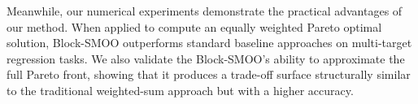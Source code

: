\documentclass[11pt,a4paper]{article}
\numberwithin{equation}{section}%
\renewcommand{\(}{\left (}
\renewcommand{\)}{\right )}
\begin{document}
Meanwhile, our numerical experiments demonstrate the practical advantages of our method. When applied to compute an equally weighted Pareto optimal solution, Block-SMOO outperforms standard baseline approaches on multi-target regression tasks. We also validate the Block-SMOO's ability to approximate the full Pareto front, showing that it produces a trade-off surface structurally similar to the traditional weighted-sum approach but with a higher accuracy.
\end{document}

